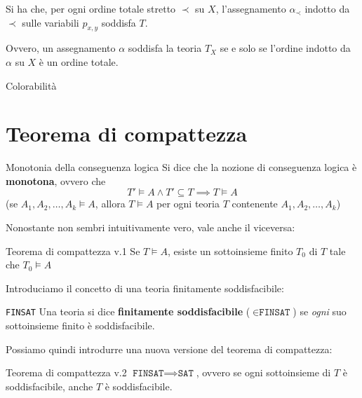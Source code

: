 \documentclass[a4paper,11pt]{report}
\begin{document}
Si ha che, per ogni ordine totale stretto \( \prec \) su \(X \), l'assegnamento \( \alpha_\prec \) indotto da \( \prec \) sulle variabili \( p_{x, y} \) soddisfa \( T \).

Ovvero, un assegnamento \( \alpha \) soddisfa la teoria \( T_X \) se e solo se l'ordine indotto da \( \alpha \) su \( X \) è un ordine totale.

\begin{gbox}{Colorabilità}

\end{gbox}

\section{Teorema di compattezza}

\begin{defbox}{Monotonia della conseguenza logica}{}
    Si dice che la nozione di conseguenza logica è \textbf{monotona}, ovvero che \[T' \vDash A \land T' \subseteq T \implies T \vDash A\]
    (se \( A_1, A_2, \dots, A_k \vDash A \), allora \( T \vDash A \) per ogni teoria \( T \) contenente \( A_1, A_2, \dots, A_k \))
\end{defbox}

Nonostante non sembri intuitivamente vero, vale anche il viceversa:

\begin{thmbox}{Teorema di compattezza v.1}{}
    Se \( T \vDash A \), esiste un sottoinsieme finito \( T_0 \) di \( T \) tale che \( T_0 \vDash A \)
\end{thmbox}

Introduciamo il concetto di una teoria finitamente soddisfacibile:

\begin{defbox}{\texttt{FINSAT}}{}
    Una teoria si dice \textbf{finitamente soddisfacibile} (\( \in \texttt{FINSAT} \)) se \textit{ogni} suo sottoinsieme finito è soddisfacibile.
\end{defbox}

Possiamo quindi introdurre una nuova versione del teorema di compattezza:

\begin{thmbox}{Teorema di compattezza v.2}{}
    \( \texttt{FINSAT}\implies \texttt{SAT} \), ovvero se ogni sottoinsieme di \( T \) è soddisfacibile, anche \( T \) è soddisfacibile.
\end{thmbox}
\end{document}
